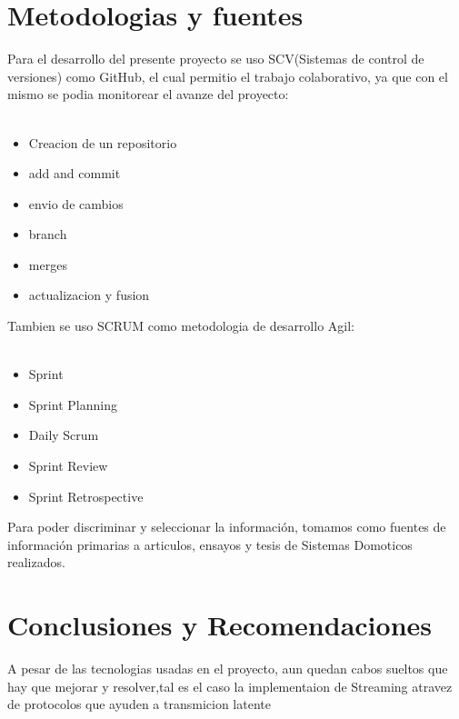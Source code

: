 \documentclass[letterpaper,12pt]{article}
\begin{document}
{\begin{itemize}
\begin{figure}[h]
			\end{figure}			
			
		\end{itemize}
		
		\section{Metodologias y fuentes}
		
		Para el desarrollo del presente proyecto se uso SCV(Sistemas de control de versiones) como GitHub, el cual permitio el trabajo colaborativo, ya que con el mismo se podia monitorear el avanze del proyecto: \\\
		\begin{itemize}
			\item Creacion de un repositorio
			\item add and commit
			\item envio de cambios
			\item branch 
			\item merges
			\item actualizacion y fusion
			
		\end{itemize}
		
		Tambien se uso SCRUM como metodologia de desarrollo Agil: \\\
		\begin{itemize}
			\item Sprint
			
			\item Sprint Planning
			
			\item Daily Scrum
			
			\item Sprint Review
			
			\item Sprint Retrospective
			
		\end{itemize}
		
		
		Para poder discriminar y seleccionar la información, tomamos como fuentes de información primarias a articulos, ensayos y tesis de Sistemas Domoticos realizados.
		
		
		\section{Conclusiones y Recomendaciones}
		
		A pesar de las tecnologias usadas en el proyecto, aun quedan cabos sueltos que hay que mejorar y resolver,tal es el caso la implementaion de Streaming atravez de protocolos que ayuden a transmicion latente\\
		
}
\end{document}
